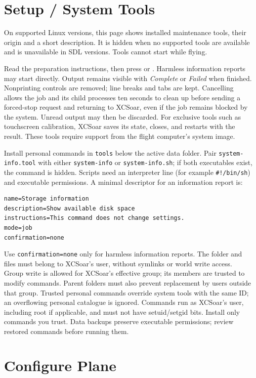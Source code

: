 \section{Setup / System Tools}

On supported Linux versions, this page shows installed maintenance tools,
their origin and a short description.  It is hidden when no supported tools
are available and is unavailable in SDL versions.  Tools cannot start while
flying.

Read the preparation instructions, then press  or
.  Harmless information reports may start directly.
Output remains visible with \emph{Complete} or \emph{Failed} when finished.
Nonprinting controls are removed; line breaks and tabs are kept.
Cancelling allows the job and its child processes ten seconds to clean up
before sending a forced-stop request and returning to XCSoar, even if the
job remains blocked by the system.  Unread output may then be discarded.
For exclusive tools such as touchscreen
calibration, XCSoar saves its state, closes, and restarts with the result.
These tools require support from the flight computer's system image.

Install personal commands in \texttt{tools} below the active data folder.
Pair \texttt{system-info.tool} with either \texttt{system-info} or
\texttt{system-info.sh}; if both executables exist, the command is hidden.
Scripts need an interpreter line (for example \texttt{\#!/bin/sh}) and
executable permissions.  A minimal descriptor for an information report is:
\begin{verbatim}
name=Storage information
description=Show available disk space
instructions=This command does not change settings.
mode=job
confirmation=none
\end{verbatim}
Use \texttt{confirmation=none} only for harmless information reports.
The folder and files must belong to XCSoar's user, without symlinks or world
write access.  Group write is allowed for XCSoar's effective group; its
members are trusted to modify commands.  Parent folders must also prevent
replacement by users outside that group.  Trusted personal commands override
system tools with the same ID; an overflowing personal catalogue is ignored.
Commands run as XCSoar's user, including root if applicable, and must not
have setuid/setgid bits.  Install only commands you trust.  Data backups
preserve executable permissions; review restored commands before running them.


\section{Configure Plane}

